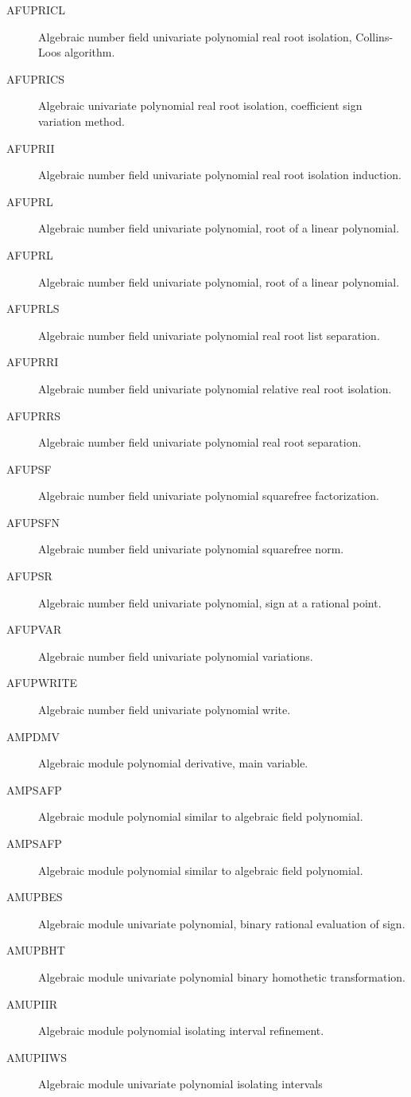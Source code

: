 \begin{description}
\begin{description}
  \item[AFUPRICL]  Algebraic number field univariate polynomial real root
    isolation, Collins-Loos algorithm.
  \item[AFUPRICS]  Algebraic univariate polynomial real root isolation,
    coefficient sign variation method.
  \item[AFUPRII]  Algebraic number field univariate polynomial real root
    isolation induction.
  \item[AFUPRL]  Algebraic number field univariate polynomial, root of a
    linear polynomial.
  \item[AFUPRL]  Algebraic number field univariate polynomial, root of a
    linear polynomial.
  \item[AFUPRLS]  Algebraic number field univariate polynomial real root list
    separation.
  \item[AFUPRRI]  Algebraic number field univariate polynomial relative real
    root isolation.
  \item[AFUPRRS]  Algebraic number field univariate polynomial real root
    separation.
  \item[AFUPSF]  Algebraic number field univariate polynomial squarefree
    factorization.
  \item[AFUPSFN]  Algebraic number field univariate polynomial squarefree
    norm.
  \item[AFUPSR]  Algebraic number field univariate polynomial, sign at a
    rational point.
  \item[AFUPVAR]  Algebraic number field univariate polynomial variations.
  \item[AFUPWRITE]  Algebraic number field univariate polynomial write.
  \item[AMPDMV]  Algebraic module polynomial derivative, main variable.
  \item[AMPSAFP]  Algebraic module polynomial similar to algebraic field
    polynomial.
  \item[AMPSAFP]  Algebraic module polynomial similar to algebraic field
    polynomial.
  \item[AMUPBES]  Algebraic module univariate polynomial, binary rational
    evaluation of sign.
  \item[AMUPBHT]  Algebraic module univariate polynomial binary homothetic
    transformation.
  \item[AMUPIIR]  Algebraic module polynomial isolating interval refinement.
  \item[AMUPIIWS]  Algebraic module univariate polynomial isolating intervals

\end{description}
\end{description}
